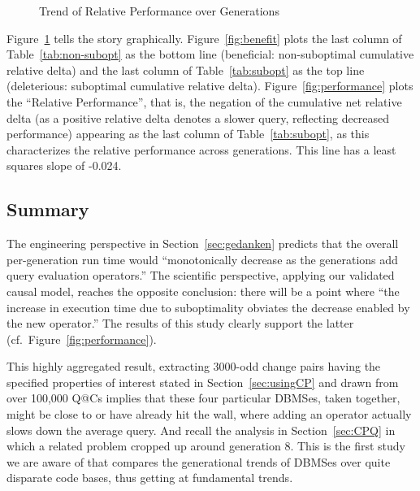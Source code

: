 \documentclass[prodmode,acmtods]{acmsmall}
\begin{document}
\begin{figure}
{        \label{fig:performance}
    }
    \caption{Trend of Relative Performance over Generations}
    \label{fig:machine_comp}
\end{figure}

Figure~\ref{fig:machine_comp} tells the story
graphically. Figure~\ref{fig:benefit} plots the last column of
Table~\ref{tab:non-subopt} as the bottom line (beneficial: non-suboptimal cumulative
relative delta) and the last column of Table~\ref{tab:subopt} as the top
line (deleterious: suboptimal cumulative relative delta).
Figure~\ref{fig:performance} plots the ``Relative Performance'', that is,
the negation of the cumulative net relative delta (as a positive relative
delta denotes a slower query, reflecting decreased performance) appearing as the
last column of Table~\ref{tab:subopt}, as this characterizes the relative
performance across generations. This line has a least squares slope of
-0.024.

\subsection{Summary}
The engineering perspective in Section~\ref{sec:gedanken}
predicts that the overall per-generation run time would ``monotonically decrease
as the generations add query evaluation operators.'' The scientific
perspective, applying our validated causal model, reaches the opposite
conclusion: there will be a point where ``the
\hbox{increase} in execution time due to suboptimality obviates the decrease
enabled by the new operator.'' The results of this study clearly support
the latter (cf.~Figure~\ref{fig:performance}).

This highly aggregated result, extracting 3000-odd change pairs having
the specified properties of interest stated in Section~\ref{sec:usingCP} and
drawn from over \hbox{100,000} Q@Cs implies that these four
particular \hbox{DBMSes}, taken together, might be close to or have already
hit the wall, where adding an operator actually slows down the average
query. And recall the analysis in Section~\ref{sec:CPQ} in which a
related problem cropped up around generation 8.  This is the
first study we are aware of that compares the generational trends of
\hbox{DBMSes} over quite disparate code bases, thus getting at fundamental
trends. 
\end{document}
